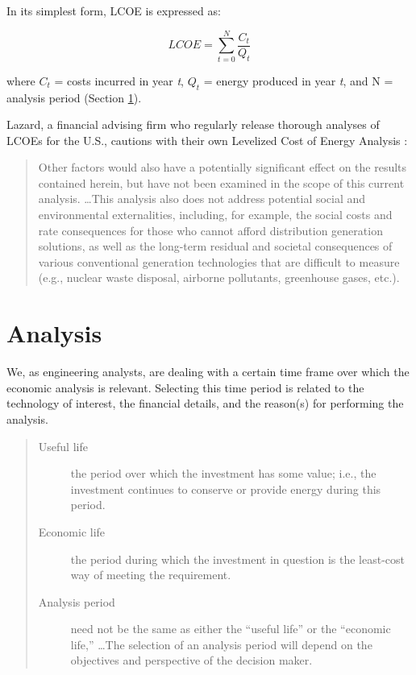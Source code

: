 \documentclass[10pt]{article}
\begin{document}
In its simplest form, LCOE is expressed as:

$$LCOE = \sum_{t=0}^{N} \frac{C_t}{Q_t}$$

where $C_t$ = costs incurred in year \textit{t}, $Q_t$ = energy produced in year \textit{t}, and N = analysis period (Section \ref{an}). \cite{Greenlaw2017}

Lazard, a financial advising firm who regularly release thorough analyses of LCOEs for the U.S., cautions with their own Levelized Cost of Energy Analysis \cite{lazards12}:

\begin{quote}
    Other factors would also have a potentially significant effect on the results
contained herein, but have not been examined in the scope of this current analysis. \ldots This analysis also does not
address potential social and environmental externalities, including, for example, the social costs and rate consequences for those who cannot
afford distribution generation solutions, as well as the long-term residual and societal consequences of various conventional generation
technologies that are difficult to measure (e.g., nuclear waste disposal, airborne pollutants, greenhouse gases, etc.). \cite{lazards12}
\end{quote}

\section{Analysis}
\label{an}

   {}
\smallskip


We, as engineering analysts, are dealing with a certain time frame over which the economic analysis is relevant. Selecting this time period is related to the technology of interest, the financial details, and the reason(s) for performing the analysis.

\begin{quote}
\begin{description}
\item[Useful life] the period over which the investment has some value; i.e., the investment continues to conserve or provide energy during this period. \cite{Goswami2007-hf}
\item[Economic life] the period during which the investment in question is the least-cost way of meeting the requirement. \cite{Goswami2007-hf}
\item[Analysis period] need not be the same as either the ``useful life'' or the ``economic life,'' \ldots The selection of an analysis period will depend on the objectives and perspective of the decision maker. \cite{Goswami2007-hf}
\end{description}
\end{quote}
\end{document}
